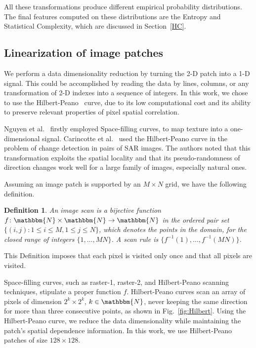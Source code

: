 \documentclass[journal]{IEEEtran}
\begin{document}
All these transformations produce different empirical probability distributions.
The final features computed on these distributions are the Entropy and Statistical Complexity, which are discussed in Section~\ref{HC}.


\subsection{Linearization of image patches}\label{linearization}

We perform a data dimensionality reduction by turning the \mbox{2-D} patch into a \mbox{1-D} signal.
This could be accomplished by reading the data by lines, columns, or any transformation of \mbox{2-D} indexes into a sequence of integers.
In this work, we chose to use the Hilbert-Peano~\cite{Lee1994Texture} curve, due to its low computational cost and its ability to preserve relevant properties of pixel spatial correlation.

Nguyen et al.~\cite{nguyen1982space} firstly employed Space-filling curves, to map texture into a one-dimensional signal.
Carincotte et al.~\cite{Carincotte2006changeDetection} used the Hilbert-Peano curve in the problem of change detection in pairs of SAR images.
The authors noted that this transformation exploits the spatial locality and that its pseudo-randomness
of direction changes work well for a large family of images, especially
natural ones.

Assuming an image patch is supported by an $M \times N$ grid, we have the following definition.

\newtheorem{mydef}{Definition}
\begin{mydef}
	An image scan is a bijective function $f \colon \mathbbm{N} \times \mathbbm{N} \to \mathbbm{N}$ in the ordered pair set $ \{(i, j): 1 \leq i \leq M , 1 \leq j \leq N\}$, which denotes the points in the domain, for the closed range of integers $\{1, \dots, M  N\}$.
	A scan rule is $\{f^{-1}(1), \dots, f^{-1}(M  N)\}$.
	\label{def:CurveFilling}
\end{mydef}
This Definition imposes that each pixel is visited only once and that all pixels are visited.

Space-filling curves, such as raster-1, raster-2, and Hilbert-Peano scanning techniques, stipulate a proper function $f$.
Hilbert-Peano curves scan an array of pixels of dimension $2^k \times 2^k$, $k \in \mathbbm{N}$, never keeping the same direction for more than three consecutive points, as shown in Fig.~\ref{fig:Hilbert}.
Using the Hilbert-Peano curve, we reduce the data dimensionality while maintaining the patch's spatial dependence information.
In this work, we use Hilbert-Peano patches of size $128 \times 128$.
\end{document}
